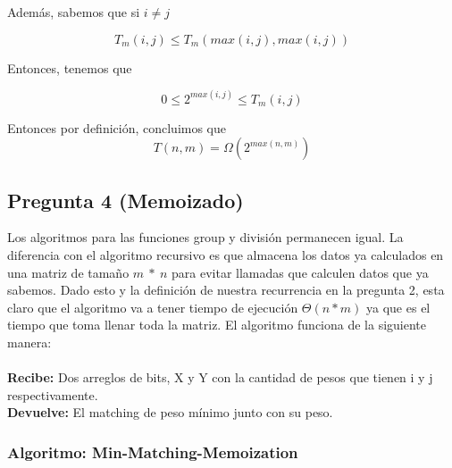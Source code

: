 \documentclass[12pt]{article}
\begin{document}
\noindent Además, sabemos que si $i\neq j$

$$T_m(i,j) \leq T_m(max(i,j),max(i,j))$$

\noindent Entonces, tenemos que

$$0\leq 2^{max(i,j)} \leq T_m(i,j) $$

\noindent Entonces por definición, concluimos que $$T(n,m) =  \Omega(2^{max(n,m)})$$

\subsection*{Pregunta 4 (Memoizado)}

\noindent Los algoritmos para las funciones group y división permanecen igual. La diferencia con el algoritmo 
recursivo es que almacena los datos ya calculados en una matriz de tamaño $m\ *\ n$ para evitar llamadas que 
calculen datos que ya sabemos. Dado esto y la definición de nuestra recurrencia en la pregunta 2, esta claro que el 
algoritmo va a tener tiempo de ejecución $\Theta(n*m)$ ya que es el tiempo que toma llenar toda la matriz. El algoritmo 
funciona de la siguiente manera:\\
\\\textbf{Recibe:} Dos arreglos de bits, X y Y con la cantidad de pesos que tienen i y j respectivamente.
\\\textbf{Devuelve:} El matching de peso mínimo junto con su peso.

\subsubsection*{Algoritmo: Min-Matching-Memoization}
\end{document}
